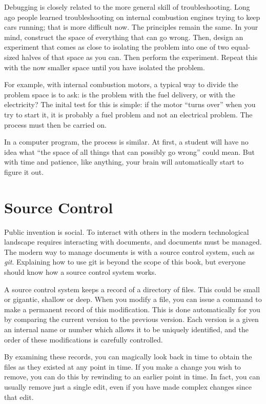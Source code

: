 \documentclass[
	fontsize=10pt, %
	twoside=false, %
	secnumdepth=1, %
]{kaobook}
\begin{document}
Debugging is closely related to the more general skill of troubleshooting.
Long ago people learned troubleshooting on internal combustion engines
trying to keep cars running; that is more difficult now. The principles
remain the same. In your mind, construct the space of everything that can
go wrong. Then, design an experiment that comes as close to isolating the
problem into one of two equal-sized halves of that space as you can.
Then perform the experiment. Repeat this with the now smaller space until
you have isolated the problem.

For example, with internal combustion motors, a typical way to divide the problem space is
to ask: is the problem with the fuel delivery, or with the electricity?
The inital test for this is simple: if the motor ``turns over'' when you try to start it,
it is probably a fuel problem and not an electrical problem.  The process must then be carried on.

In a computer program, the process is similar. At first, a student will have no idea
what ``the space of all things that can possibly go wrong'' could mean. But with time and patience,
like anything, your brain will automatically start to figure it out.

\section{Source Control}

Public invention is social. To interact with others
in the modern technological landscape requires interacting
with documents, and documents must be managed.
The modern way to manage documents is with a source control
system, such as {\em git}. Explaining how to use git is beyond
the scope of this book, but everyone should know how a source control
system works.

A source control system keeps a record of a directory of files.
This could be small or gigantic, shallow or deep.
When you modify a file, you can issue a command to make a permanent
record of this modification. This is done automatically for you
by comparing the current version to the previous version.
Each version is a given an internal name or number which allows
it to be uniquely identified, and the order of these modifications
is carefully controlled.

By examining these records, you can magically look back in time
to obtain the files as they existed at any point in time.
If you make a change you wish to remove, you can do this by
rewinding to an earlier point in time.
In fact, you can usually remove just a single edit, even if
you have made complex changes since that edit.
\end{document}
